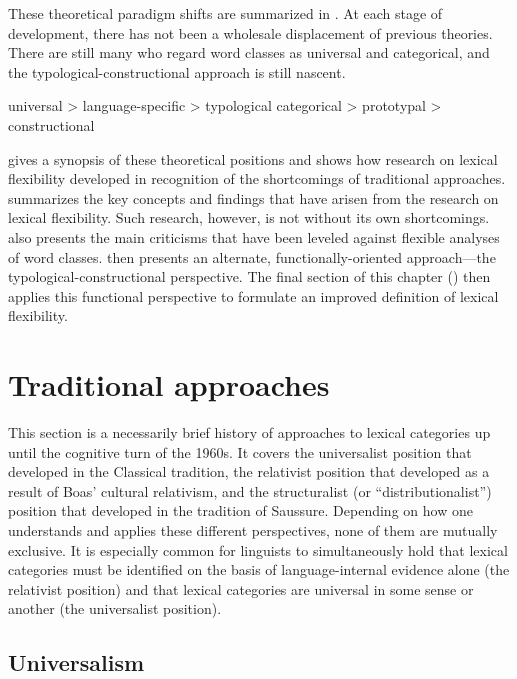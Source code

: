 These theoretical paradigm shifts are summarized in . At each stage of development, there has not been a wholesale displacement of previous theories. There are still many who regard word classes as universal and categorical, and the typological-constructional approach is still nascent.

\begin{exe}
  \ex\label{ex:2.1}
  \begin{xlist}
    \ex universal > language-specific > typological
    \ex categorical > prototypal > constructional
  \end{xlist}
\end{exe}

 gives a synopsis of these theoretical positions and shows how research on lexical flexibility developed in recognition of the shortcomings of traditional approaches.  summarizes the key concepts and findings that have arisen from the research on lexical flexibility. Such research, however, is not without its own shortcomings.  also presents the main criticisms that have been leveled against flexible analyses of word classes.  then presents an alternate, functionally-oriented approach—the typological-constructional perspective. The final section of this chapter () then applies this functional perspective to formulate an improved definition of lexical flexibility.

\section{Traditional approaches}
\label{sec:2.2}

This section is a necessarily brief history of approaches to lexical categories up until the cognitive turn of the 1960s. It covers the universalist position that developed in the Classical tradition, the relativist position that developed as a result of Boas' cultural relativism, and the structuralist (or \enquote{distributionalist}) position that developed in the tradition of Saussure. Depending on how one understands and applies these different perspectives, none of them are mutually exclusive. It is especially common for linguists to simultaneously hold that lexical categories must be identified on the basis of language-internal evidence alone (the relativist position) and that lexical categories are universal in some sense or another (the universalist position).

\subsection{Universalism}
\label{sec:2.2.1}

